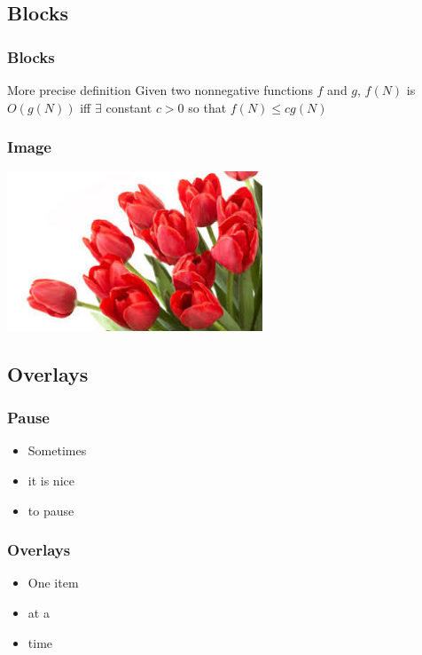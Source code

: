 \documentclass{beamer}
\begin{document}
\subsection{Blocks}
\begin{frame}
  \frametitle{Blocks}
    \begin{alertblock}{More precise definition}
    Given two nonnegative functions $f$ and $g$, $f(N)$ is  $O(g(N))$ iff $\exists$ constant $c > 0$ so that $f(N) \leq c g(N)$
    \end{alertblock}
\end{frame}
\begin{frame}[label=Flower]
  \frametitle{Image}
    \begin{center}
        \includegraphics[width=3in]{images/flower.jpeg}
    \end{center}
    \hyperlink{Overlays}{}
\end{frame}
\subsection{Overlays}
\begin{frame}
  \frametitle{Pause}
  \pause
 	\begin{itemize}
        \item Sometimes
        \pause
        \item it is nice
        \pause
        \item to pause
    \end{itemize}
\end{frame}
\begin{frame}[label=Overlays]
  \frametitle{Overlays}

    \begin{itemize}
        \item<1-> One item
        \item<2-> at a 
        \item<3-> time
    \end{itemize}
    \hyperlink{Flower}{}
\end{frame}
\end{document}
